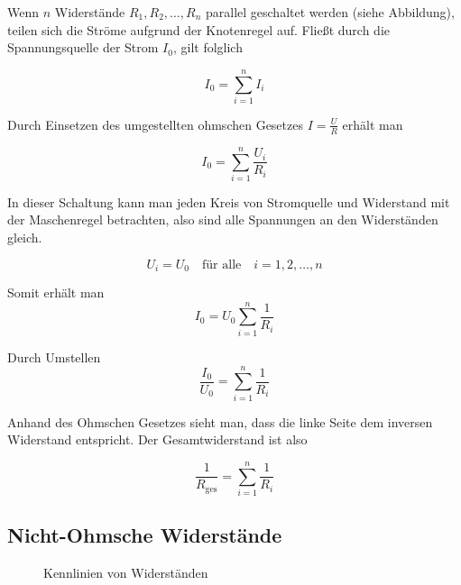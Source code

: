 Wenn $n$ Widerstände $R_1, R_2, \dots, R_n$ parallel geschaltet werden (siehe
Abbildung), teilen sich die Ströme aufgrund der Knotenregel auf.
Fließt durch die Spannungsquelle der Strom $I_0$, gilt folglich

\begin{equation}
  I_0 = \sum_{i=1}^n I_i
\end{equation}

Durch Einsetzen des umgestellten ohmschen Gesetzes $I = \frac{U}{R}$ erhält man

\begin{equation}
  I_0 = \sum_{i=1}^n \frac{U_i}{R_i}
\end{equation}

In dieser Schaltung kann man jeden Kreis von Stromquelle und Widerstand mit der
Maschenregel betrachten, also sind alle Spannungen an den Widerständen gleich.

\begin{equation}
  U_i = U_0 \quad\text{für alle}\quad i = 1, 2, \dots, n
\end{equation}

Somit erhält man
\begin{equation}
  I_0 = U_0 \sum_{i=1}^n \frac{1}{R_i}
\end{equation}

Durch Umstellen
\begin{equation}
  \frac{I_0}{U_0} = \sum_{i=1}^n \frac{1}{R_i}
\end{equation}

Anhand des Ohmschen Gesetzes sieht man, dass die linke Seite dem inversen
Widerstand entspricht. Der Gesamtwiderstand ist also

\begin{equation}
  \frac{1}{R_\text{ges}} = \sum_{i=1}^n \frac{1}{R_i}
\end{equation}

\subsection{Nicht-Ohmsche Widerstände}
\begin{figure}[H]
  \begin{center}
    \caption{Kennlinien von Widerständen}
  \end{center}
\end{figure}

